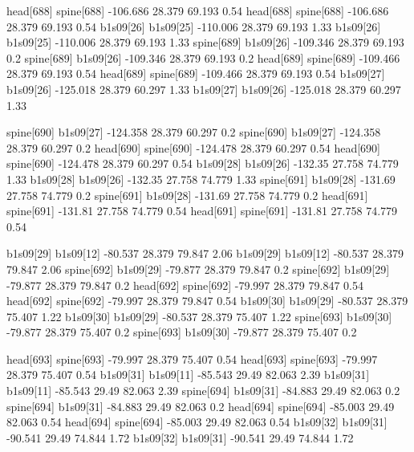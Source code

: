 head[688]    spine[688]    -106.686    28.379    69.193    0.54
head[688]    spine[688]    -106.686    28.379    69.193    0.54
b1s09[26]    b1s09[25]    -110.006    28.379    69.193    1.33
b1s09[26]    b1s09[25]    -110.006    28.379    69.193    1.33
spine[689]    b1s09[26]    -109.346    28.379    69.193    0.2
spine[689]    b1s09[26]    -109.346    28.379    69.193    0.2
head[689]    spine[689]    -109.466    28.379    69.193    0.54
head[689]    spine[689]    -109.466    28.379    69.193    0.54
b1s09[27]    b1s09[26]    -125.018    28.379    60.297    1.33
b1s09[27]    b1s09[26]    -125.018    28.379    60.297    1.33


spine[690]    b1s09[27]    -124.358    28.379    60.297    0.2
spine[690]    b1s09[27]    -124.358    28.379    60.297    0.2
head[690]    spine[690]    -124.478    28.379    60.297    0.54
head[690]    spine[690]    -124.478    28.379    60.297    0.54
b1s09[28]    b1s09[26]    -132.35    27.758    74.779    1.33
b1s09[28]    b1s09[26]    -132.35    27.758    74.779    1.33
spine[691]    b1s09[28]    -131.69    27.758    74.779    0.2
spine[691]    b1s09[28]    -131.69    27.758    74.779    0.2
head[691]    spine[691]    -131.81    27.758    74.779    0.54
head[691]    spine[691]    -131.81    27.758    74.779    0.54


b1s09[29]    b1s09[12]    -80.537    28.379    79.847    2.06
b1s09[29]    b1s09[12]    -80.537    28.379    79.847    2.06
spine[692]    b1s09[29]    -79.877    28.379    79.847    0.2
spine[692]    b1s09[29]    -79.877    28.379    79.847    0.2
head[692]    spine[692]    -79.997    28.379    79.847    0.54
head[692]    spine[692]    -79.997    28.379    79.847    0.54
b1s09[30]    b1s09[29]    -80.537    28.379    75.407    1.22
b1s09[30]    b1s09[29]    -80.537    28.379    75.407    1.22
spine[693]    b1s09[30]    -79.877    28.379    75.407    0.2
spine[693]    b1s09[30]    -79.877    28.379    75.407    0.2


head[693]    spine[693]    -79.997    28.379    75.407    0.54
head[693]    spine[693]    -79.997    28.379    75.407    0.54
b1s09[31]    b1s09[11]    -85.543    29.49    82.063    2.39
b1s09[31]    b1s09[11]    -85.543    29.49    82.063    2.39
spine[694]    b1s09[31]    -84.883    29.49    82.063    0.2
spine[694]    b1s09[31]    -84.883    29.49    82.063    0.2
head[694]    spine[694]    -85.003    29.49    82.063    0.54
head[694]    spine[694]    -85.003    29.49    82.063    0.54
b1s09[32]    b1s09[31]    -90.541    29.49    74.844    1.72
b1s09[32]    b1s09[31]    -90.541    29.49    74.844    1.72


